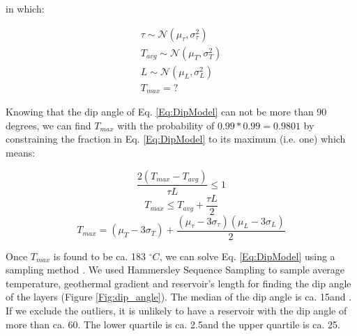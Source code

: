 \documentclass[review,authoryear, 12pt]{elsarticle}\usepackage[]{graphicx}\usepackage[]{color}
\begin{document}
in which:

\begin{eqnarray}
\tau \sim \mathcal{N}(\mu_\tau,\sigma^2_\tau) \\
T_{avg} \sim \mathcal{N}(\mu_T,\sigma^2_T) \\
L \sim \mathcal{N}(\mu_L,\sigma^2_L) \\
T_{max}=?
\end{eqnarray}

Knowing that the dip angle of Eq. \ref{Eq:DipModel} can not be more than 90 degrees, we can find $T_{max}$ with the probability of $0.99*0.99=0.9801$ by constraining the fraction in Eq. \ref{Eq:DipModel} to its maximum (i.e. one) which means:

\begin{equation}
\frac{2(T_{max}-T_{avg})}{\tau L} \leq 1 
\end{equation}
\begin{equation}
T_{max} \leq T_{avg}+\frac{\tau L}{2} 
\end{equation}
\begin{equation}
T_{max} = ({\mu_T-3\sigma_T})+\frac{(\mu_{\tau}-3\sigma_{\tau})(\mu_{L}-3\sigma_L)}{2}
\label{Eq:TmaxSolution}
\end{equation}




Once $T_{max}$  is found to be ca. 183 $^\circ C$, we can solve Eq. \ref{Eq:DipModel} using a sampling method \citep{kroese2011handbook}. We used Hammersley Sequence Sampling to sample average temperature, geothermal gradient and reservoir's length for finding the dip angle of the layers (Figure \ref{Fig:dip_angle}). The median of the dip angle is ca. 15\degree and . If we exclude the outliers, it is unlikely to have a reservoir with the dip angle of more than ca. 60\degree. The lower quartile is ca. 2.5\degree and the upper quartile is ca. 25\degree.
\end{document}
